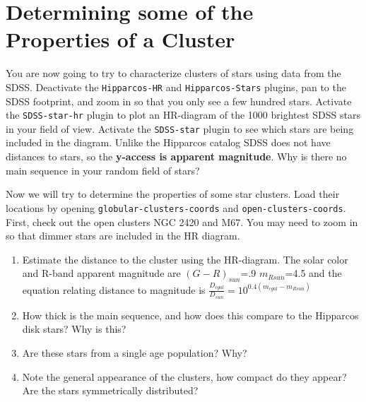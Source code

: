 \documentclass[12pt]{article}
\begin{document}
\section*{Determining some of the Properties of a Cluster}

You are now going to try to characterize clusters of stars using data from the SDSS. Deactivate the \texttt{Hipparcos-HR} and \texttt{Hipparcos-Stars} plugins, pan to the SDSS footprint, and zoom in so that you only see a few hundred stars. Activate the \texttt{SDSS-star-hr} plugin to plot an HR-diagram of the 1000 brightest SDSS stars in your field of view. Activate the \texttt{SDSS-star} plugin to see which stars are being included in the diagram. Unlike the Hipparcos catalog SDSS does not have distances to stars, so the \textbf{y-access is apparent magnitude}. Why is there no main sequence in your random field of stars? 


Now we will try to determine the properties of some star clusters. Load their locations by opening \texttt{globular-clusters-coords} and \texttt{open-clusters-coords}. First, check out the open clusters NGC 2420 and M67. You may need to zoom in so that dimmer stars are included in the HR diagram. 
\begin{enumerate}
\item Estimate the distance to the cluster using the HR-diagram. The solar color and R-band apparent magnitude are 
$(G-R)_{sun}$=.9
$m_{Rsun}$=4.5  
and the equation relating distance to magnitude is 
$\frac{D_{cgal}}{D_{sun}}=10^{0.4(m_{cgal}-m_{Rsun})}$

\item How thick is the main sequence, and how does this compare to the Hipparcos disk stars? Why is this?
\item Are these stars from a single age population? Why?
\item Note the general appearance of the clusters, how compact do they appear? Are the stars symmetrically distributed?
\end{enumerate}
\end{document}
